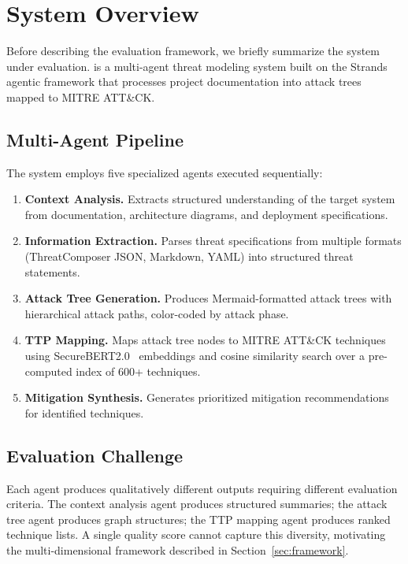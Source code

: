 \section{\threatforest{} System Overview}
\label{sec:system}

Before describing the evaluation framework, we briefly summarize the system under evaluation. \threatforest{} is a multi-agent threat modeling system built on the Strands agentic framework that processes project documentation into attack trees mapped to MITRE ATT\&CK.

\subsection{Multi-Agent Pipeline}

The system employs five specialized agents executed sequentially:

\begin{enumerate}
    \item \textbf{Context Analysis.} Extracts structured understanding of the target system from documentation, architecture diagrams, and deployment specifications.
    \item \textbf{Information Extraction.} Parses threat specifications from multiple formats (ThreatComposer JSON, Markdown, YAML) into structured threat statements.
    \item \textbf{Attack Tree Generation.} Produces Mermaid-formatted attack trees with hierarchical attack paths, color-coded by attack phase.
    \item \textbf{TTP Mapping.} Maps attack tree nodes to MITRE ATT\&CK techniques using SecureBERT2.0~\cite{aghaei2023securebert} embeddings and cosine similarity search over a pre-computed index of 600+ techniques.
    \item \textbf{Mitigation Synthesis.} Generates prioritized mitigation recommendations for identified techniques.
\end{enumerate}

\subsection{Evaluation Challenge}

Each agent produces qualitatively different outputs requiring different evaluation criteria. The context analysis agent produces structured summaries; the attack tree agent produces graph structures; the TTP mapping agent produces ranked technique lists. A single quality score cannot capture this diversity, motivating the multi-dimensional framework described in Section~\ref{sec:framework}.
